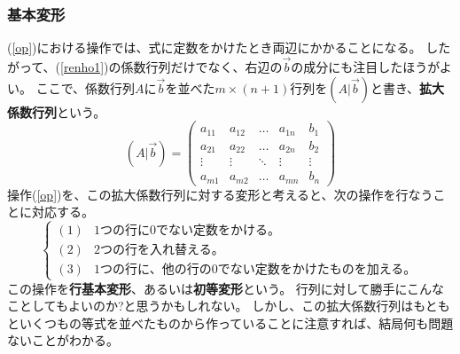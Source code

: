 \documentclass[10pt]{jsarticle}
\theoremstyle{definition}%
\newcommand{\kakko}[1]{\left(#1 \right)} %
\numberwithin{equation}{section}%
\begin{document}
\subsubsection{基本変形}
(\ref{op})における操作では、式に定数をかけたとき両辺にかかることになる。
したがって、(\ref{renho1})の係数行列だけでなく、右辺の$\vec{b}$の成分にも注目したほうがよい。
ここで、係数行列$A$に$\vec{b}$を並べた$m\times(n+1)$行列を$(A|\vec{b})$と書き、{\bf 拡大係数行列}という。
\begin{equation}
  (A|\vec{b})=
  \kakko{\begin{array}{cccc|c} 
    a_{11} & a_{12} & \dots  & a_{1n}  & b_{1} \\ 
    a_{21} & a_{22} & \dots  & a_{2n}  & b_{2}\\
    \vdots & \vdots & \ddots & \vdots  & \vdots \\
    a_{m1} & a_{m2} & \dots  & a_{mn} & b_{n}
  \end{array}}
\end{equation}
操作(\ref{op})を、この拡大係数行列に対する変形と考えると、次の操作を行なうことに対応する。
\begin{equation}
  \label{operation}  \begin{cases}
      (1) & \text{1つの行に0でない定数をかける。}\\
      (2) & \text{2つの行を入れ替える。}\\
      (3) & \text{1つの行に、他の行の0でない定数をかけたものを加える。}
    \end{cases}
\end{equation}
この操作を{\bf 行基本変形}、あるいは{\bf 初等変形}という。
行列に対して勝手にこんなことしてもよいのか?と思うかもしれない。
しかし、この拡大係数行列はもともといくつもの等式を並べたものから作っていることに注意すれば、結局何も問題ないことがわかる。
\end{document}
